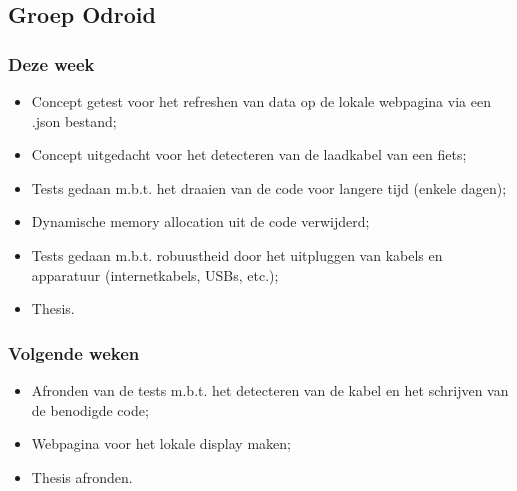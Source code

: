 \subsection*{Groep Odroid}
\subsubsection*{Deze week}

\begin{itemize}
\item Concept getest voor het refreshen van data op de lokale webpagina via een .json bestand;
\item Concept uitgedacht voor het detecteren van de laadkabel van een fiets;
\item Tests gedaan m.b.t. het draaien van de code voor langere tijd (enkele dagen);
\item Dynamische memory allocation uit de code verwijderd;
\item Tests gedaan m.b.t. robuustheid door het uitpluggen van kabels en apparatuur (internetkabels, USBs, etc.);
\item Thesis.
\end{itemize}

\subsubsection*{Volgende weken}
\begin{itemize}
\item Afronden van de tests m.b.t. het detecteren van de kabel en het schrijven van de benodigde code;
\item Webpagina voor het lokale display maken;
\item Thesis afronden.
\end{itemize}